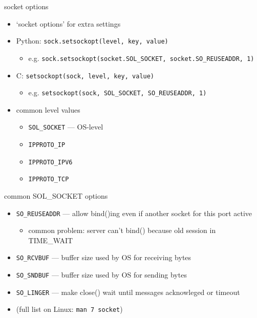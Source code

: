 \begin{frame}[fragile]{socket options}
\begin{itemize}
\item `socket options' for extra settings
\item Python: \texttt{sock.setsockopt(level, key, value)}
    \begin{itemize}
    \item e.g. \texttt{sock.setsockopt(socket.SOL\_SOCKET, socket.SO\_REUSEADDR, 1)}
    \end{itemize}
\item C: \texttt{setsockopt(sock, level, key, value)}
    \begin{itemize}
    \item e.g. \texttt{setsockopt(sock, SOL\_SOCKET, SO\_REUSEADDR, 1)}
    \end{itemize}
\vspace{.5cm}
\item common level values
    \begin{itemize}
    \item \texttt{SOL\_SOCKET} --- OS-level
    \item \texttt{IPPROTO\_IP}
    \item \texttt{IPPROTO\_IPV6}
    \item \texttt{IPPROTO\_TCP}
    \end{itemize}
\end{itemize}
\end{frame}

\begin{frame}{common SOL\_SOCKET options}
    \begin{itemize}
    \item \texttt{SO\_REUSEADDR} --- allow bind()ing even if another socket for this port active
        \begin{itemize}
        \item common problem: server can't bind() because old session in TIME\_WAIT
        \end{itemize}
    \item \texttt{SO\_RCVBUF} --- buffer size used by OS for receiving bytes
    \item \texttt{SO\_SNDBUF} --- buffer size used by OS for sending bytes
    \item \texttt{SO\_LINGER} --- make close() wait until messages acknowleged or timeout
    \vspace{.5cm}
    \item (full list on Linux: \texttt{man 7 socket})
    \end{itemize}
\end{frame}

